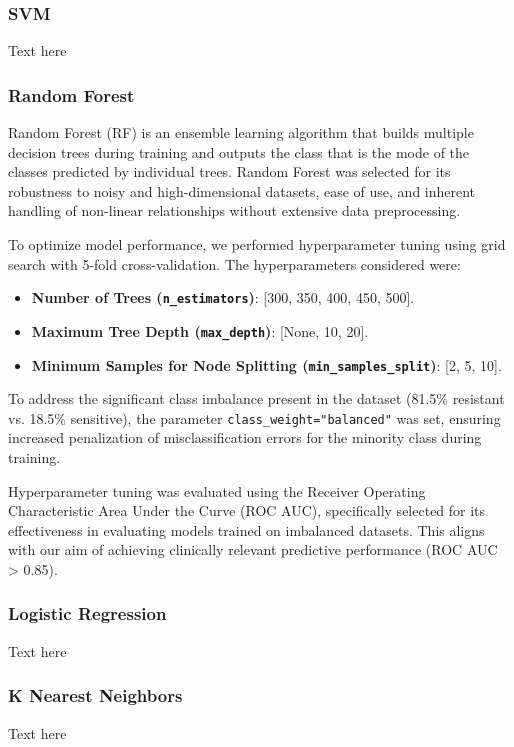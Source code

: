 \documentclass{article}
\begin{document}
\subsubsection{SVM}
Text here

\subsubsection{Random Forest}
Random Forest (RF) is an ensemble learning algorithm that builds multiple decision trees during training and outputs the class that is the mode of the classes predicted by individual trees. Random Forest was selected for its robustness to noisy and high-dimensional datasets, ease of use, and inherent handling of non-linear relationships without extensive data preprocessing.

To optimize model performance, we performed hyperparameter tuning using grid search with 5-fold cross-validation. The hyperparameters considered were:

\begin{itemize}
    \item \textbf{Number of Trees (\texttt{n\_estimators})}: [300, 350, 400, 450, 500].
    \item \textbf{Maximum Tree Depth (\texttt{max\_depth})}: [None, 10, 20].
    \item \textbf{Minimum Samples for Node Splitting (\texttt{min\_samples\_split})}: [2, 5, 10].
\end{itemize}

To address the significant class imbalance present in the dataset (81.5\% resistant vs. 18.5\% sensitive), the parameter \texttt{class\_weight="balanced"} was set, ensuring increased penalization of misclassification errors for the minority class during training.

Hyperparameter tuning was evaluated using the Receiver Operating Characteristic Area Under the Curve (ROC AUC), specifically selected for its effectiveness in evaluating models trained on imbalanced datasets. This aligns with our aim of achieving clinically relevant predictive performance (ROC AUC > 0.85).

\subsubsection{Logistic Regression}
Text here

\subsubsection{K Nearest Neighbors}
Text here
\end{document}
